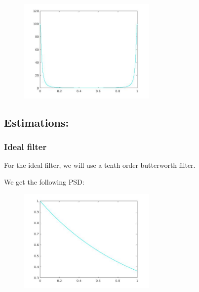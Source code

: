 \documentclass[a4paper,11pt]{article}
\begin{document}
\begin{figure}[!hp]
    \begin{center}
      \includegraphics[width=0.6\textwidth]{images/lab1_35.jpg}
    \end{center}
\end{figure}

\newpage

\subsection{Estimations:}

\subsubsection{Ideal filter}

For the ideal filter, we will use a tenth order butterworth filter.

We get the following PSD:

\begin{figure}[!hp]
    \begin{center}
      \includegraphics[width=0.6\textwidth]{images/lab1_22.jpg}
    \end{center}
\end{figure}
\end{document}
